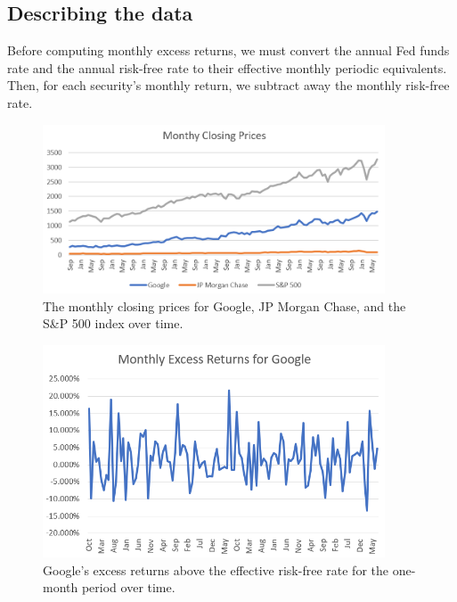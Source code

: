 \documentclass[12pt]{article}
\begin{document}
\subsection{Describing the data}
Before computing monthly excess returns, we must convert the annual Fed funds rate and the annual risk-free rate to their effective monthly periodic equivalents. Then, for each security's monthly return, we subtract away the monthly risk-free rate.

\begin{figure}[h!]
\begin{center}
\includegraphics[width=4in]{images/monthly-closing-prices.png}
\end{center}
\caption{The monthly closing prices for Google, JP Morgan Chase, and the S\&P 500 index over time.\label{fig:monthly-closing-prices}}
\end{figure}
\begin{figure}[H]
\begin{center}
\includegraphics[width=4in]{images/google.png}
\end{center}
\caption{Google's excess returns above the effective risk-free rate for the one-month period over time.\label{fig:google}}
\end{figure}
\end{document}
